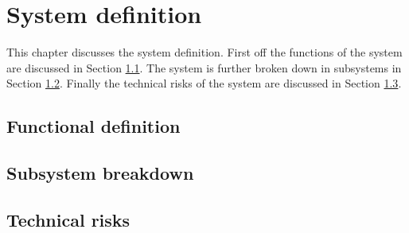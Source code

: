 \section{System definition}\label{cha:sysdef}

This chapter discusses the system definition. First off the functions of the system are discussed in Section \ref{sec:funcdef}. The system is further broken down in subsystems in Section \ref{sec:subsysbreak}. Finally the technical risks of the system are discussed in Section \ref{sec:sysrisk}.


\subsection{Functional definition} \label{sec:funcdef}


\subsection{Subsystem breakdown} \label{sec:subsysbreak}


\subsection{Technical risks} \label{sec:sysrisk}

